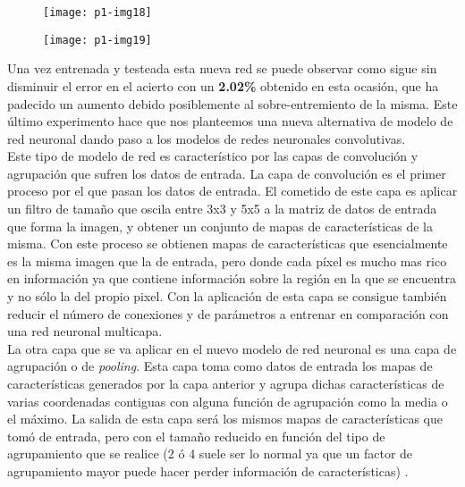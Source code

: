 \documentclass[10pt]{article}
\begin{document}
\begin{figure}[H]
	\begin{center}
 		\texttt{[image: p1-img18]}
	\end{center} 
\end{figure}

\begin{figure}[H]
	\begin{center}
 		\texttt{[image: p1-img19]}
	\end{center} 
\end{figure}

Una vez entrenada y testeada esta nueva red se puede observar como sigue sin disminuir el error en el acierto con un \textbf{2.02\% } obtenido en esta ocasión, que ha padecido un aumento debido posiblemente al sobre-entremiento de la misma. Este último experimento hace que nos planteemos una nueva alternativa de modelo de red neuronal dando paso a los modelos de redes neuronales convolutivas. \\

Este tipo de modelo de red es característico por las capas de convolución y agrupación que sufren los datos de entrada. La capa de convolución es el primer proceso por el que pasan los datos de entrada. El cometido de este capa es aplicar un filtro de tamaño que oscila entre 3x3 y 5x5 a la matriz de datos de entrada que forma la imagen, y obtener un conjunto de mapas de características de la misma. Con este proceso se obtienen mapas de características que esencialmente es la misma imagen que la de entrada, pero donde cada píxel es mucho mas rico en información ya que contiene información sobre la región en la que se encuentra y no sólo la del propio pixel.  Con la aplicación de esta capa se consigue también reducir el número de conexiones y de parámetros a entrenar en comparación con una red neuronal multicapa.\\

La otra capa que se va aplicar en el nuevo modelo de red neuronal es una capa de agrupación o de \textit{pooling}. Esta capa toma como datos de entrada los mapas de características generados por la capa anterior y agrupa dichas características de varias coordenadas contiguas con alguna función de agrupación como la media o el máximo. La salida de esta capa será los mismos mapas de características que tomó de entrada, pero con el tamaño reducido en función del tipo de agrupamiento que se realice (2 ó 4 suele ser lo normal ya que un factor de agrupamiento mayor puede hacer perder información de características) . \\
\end{document}
